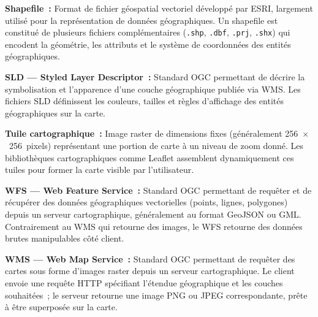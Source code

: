 \documentclass[12pt, a4paper]{report}
\begin{document}
\medskip
\noindent\textbf{Shapefile~:}
Format de fichier géospatial vectoriel développé par ESRI, largement utilisé pour
la représentation de données géographiques. Un shapefile est constitué de plusieurs
fichiers complémentaires (\texttt{.shp}, \texttt{.dbf}, \texttt{.prj},
\texttt{.shx}) qui encodent la géométrie, les attributs et le système de
coordonnées des entités géographiques.

\medskip
\noindent\textbf{SLD --- Styled Layer Descriptor~:}
Standard OGC permettant de décrire la symbolisation et l'apparence d'une couche
géographique publiée via WMS. Les fichiers SLD définissent les couleurs, tailles
et règles d'affichage des entités géographiques sur la carte.

\medskip
\noindent\textbf{Tuile cartographique~:}
Image raster de dimensions fixes (généralement 256~$\times$~256~pixels)
représentant une portion de carte à un niveau de zoom donné. Les bibliothèques
cartographiques comme Leaflet assemblent dynamiquement ces tuiles pour former la
carte visible par l'utilisateur.

\medskip
\noindent\textbf{WFS --- Web Feature Service~:}
Standard OGC permettant de requêter et de récupérer des données géographiques
vectorielles (points, lignes, polygones) depuis un serveur cartographique,
généralement au format GeoJSON ou GML. Contrairement au WMS qui retourne des
images, le WFS retourne des données brutes manipulables côté client.

\medskip
\noindent\textbf{WMS --- Web Map Service~:}
Standard OGC permettant de requêter des cartes sous forme d'images raster depuis
un serveur cartographique. Le client envoie une requête HTTP spécifiant l'étendue
géographique et les couches souhaitées~; le serveur retourne une image PNG ou
JPEG correspondante, prête à être superposée sur la carte.

\clearpage

\dominitoc
\tableofcontents
\clearpage

\listoffigures
{}
\clearpage

\listoftables
{}
\clearpage
\end{document}
